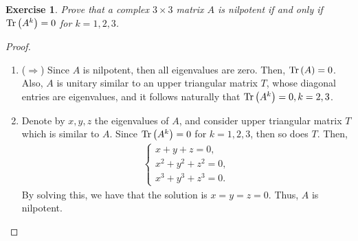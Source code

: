 \documentclass[11pt]{article}
\newtheorem{exercise}{Exercise}[section]
\theoremstyle{definition}
\numberwithin{equation}{subsection}
\begin{document}
\medskip

\begin{exercise}
Prove that a complex $3 \times 3$ matrix $A$ is nilpotent if and only if $\Tr \left(A^k\right) = 0$ for $k = 1, 2, 3$.
\end{exercise}
\begin{proof}
~\begin{enumerate}[label=(\alph*)]
    \item ($\Rightarrow$) Since $A$ is nilpotent, then all eigenvalues are zero. Then, $\Tr \left(A\right) = 0$. Also, $A$ is unitary similar to an upper triangular matrix $T$, whose diagonal entries are eigenvalues, and it follows naturally that $\Tr \left(A^k\right) = 0, k = 2, 3$.
    
    \item Denote by $x, y, z$ the eigenvalues of $A$, and consider upper triangular matrix $T$ which is similar to $A$. Since $\Tr \left(A^k\right) = 0$ for $k = 1, 2, 3$, then so does $T$. Then,
    \begin{align*}
        \begin{cases}
            x + y + z = 0, \\
            x^2 + y^2 + z^2 = 0, \\
            x^3 + y^3 + z^3 = 0.
        \end{cases}
    \end{align*}
    By solving this, we have that the solution is $x = y = z = 0$. Thus, $A$ is nilpotent.
\end{enumerate}
\end{proof}

\medskip
\end{document}
